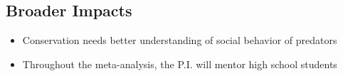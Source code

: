 \subsection{Broader Impacts}
\begin{itemize}
\item Conservation needs better understanding of social behavior of predators
\item Throughout the meta-analysis, the P.I. will mentor high school students
\end{itemize}
